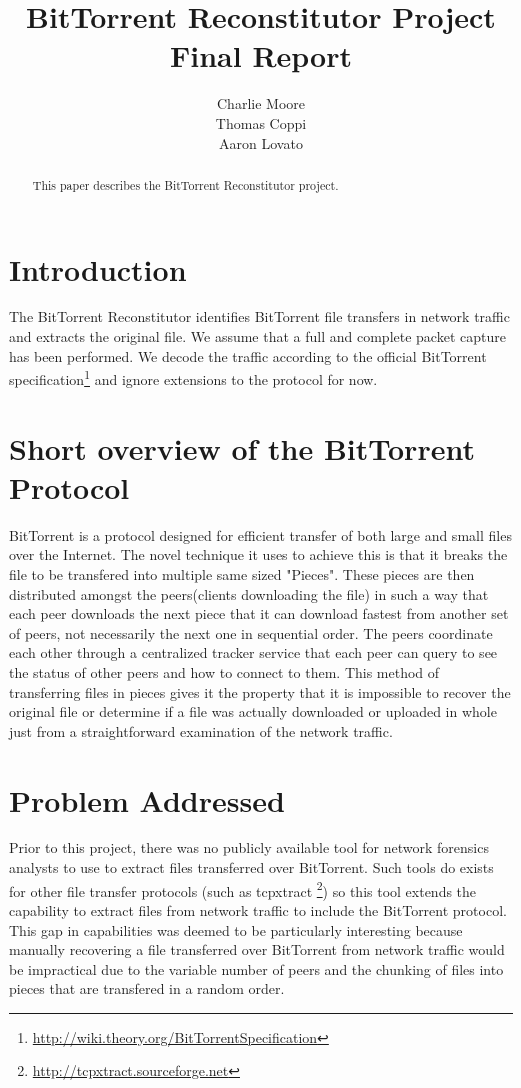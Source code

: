 \documentclass{acm_proc_article-sp}
\author{
  \alignauthor
  Charlie Moore\\
  \email{cmoore@nmt.edu}
  \alignauthor
  Thomas Coppi\\
  \email{tcoppi@nmt.edu}
  \alignauthor
  Aaron Lovato\\
  \email{alovato@nmt.edu}
}
\title{BitTorrent Reconstitutor Project Final Report}
\begin{document}
\maketitle
\begin{abstract}
This paper describes the BitTorrent Reconstitutor project.
\end{abstract}


\section{Introduction}
The BitTorrent Reconstitutor identifies BitTorrent file transfers in network
traffic and extracts the original file.  We assume that a full and complete
packet capture has been performed.  We decode the traffic according to the
official BitTorrent
specification\footnote{\url{http://wiki.theory.org/BitTorrentSpecification}} and
ignore extensions to the protocol for now.

\section{Short overview of the BitTorrent Protocol}
BitTorrent is a protocol designed for efficient transfer of both large and
small files over the Internet. The novel technique it uses to achieve this is
that it breaks the file to be transfered into multiple same sized "Pieces".
These pieces are then distributed amongst the peers(clients downloading the
file) in such a way that each peer downloads the next piece that it can
download fastest from another set of peers, not necessarily the next one in
sequential order.  The peers coordinate each other through a centralized
tracker service that each peer can query to see the status of other peers and
how to connect to them.  This method of transferring files in pieces gives it
the property that it is impossible to recover the original file or determine if
a file was actually downloaded or uploaded in whole just from a straightforward
examination of the network traffic.

\section{Problem Addressed}
Prior to this project, there was no publicly available tool for network
forensics analysts to use to extract files transferred over BitTorrent. Such
tools do exists for other file transfer protocols (such as tcpxtract
\footnote{\url{http://tcpxtract.sourceforge.net}}) so this tool extends the
capability to extract files from network traffic to include the BitTorrent
protocol. This gap in capabilities was deemed to be particularly interesting
because manually recovering a file transferred over BitTorrent from network
traffic would be impractical due to the variable number of peers and the
chunking of files into pieces that are transfered in a random order.
\end{document}
